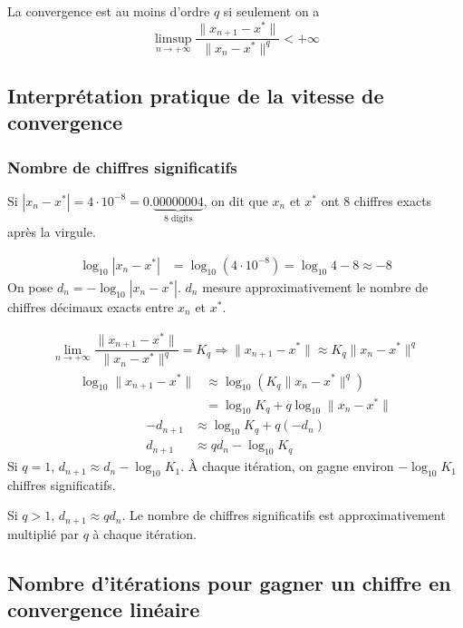 \documentclass[oneside]{book}
\begin{document}
\begin{remark}
La convergence est au moins d'ordre $q$ si seulement on a
$$ \limsup\limits_{n \to +\infty} \dfrac{\|x_{n+1}-x^*\|}{\|x_n-x^*\|^q} < +\infty $$
\end{remark}

\subsection{Interprétation pratique de la vitesse de convergence}

\subsubsection{Nombre de chiffres significatifs}
\begin{remark}
Si $|x_n - x^*| = 4 \cdot 10^{-8} = 0.\underbrace{00000004}_{\text{8 digits}}$,
on dit que $x_n$ et $x^*$ ont 8 chiffres exacts après la virgule.
\end{remark}

\begin{align*}
\log_{10} |x_n - x^*| &= \log_{10} (4 \cdot 10^{-8}) = \log_{10} 4 - 8 \approx -8
\end{align*}
On pose $d_n = -\log_{10} |x_n - x^*|$. $d_n$ mesure approximativement le nombre de chiffres décimaux exacts entre $x_n$ et $x^*$.

\begin{align*}
\lim\limits_{n \to +\infty} \dfrac{\|x_{n+1}-x^*\|}{\|x_n-x^*\|^q} = K_q \Rightarrow \|x_{n+1}-x^*\| \approx K_q \|x_n-x^*\|^q
\end{align*}
\begin{align*}
\log_{10} \|x_{n+1}-x^*\| &\approx \log_{10} (K_q \|x_n-x^*\|^q) \\
&= \log_{10} K_q + q \log_{10} \|x_n-x^*\|
\end{align*}
\begin{align*}
-d_{n+1} &\approx \log_{10} K_q + q (-d_n) \\
d_{n+1} &\approx q d_n - \log_{10} K_q
\end{align*}
Si $q=1$, $d_{n+1} \approx d_n - \log_{10} K_1$. À chaque itération, on gagne environ $-\log_{10} K_1$ chiffres significatifs.

Si $q > 1$, $d_{n+1} \approx q d_n$. Le nombre de chiffres significatifs est approximativement multiplié par $q$ à chaque itération.

\subsection{Nombre d'itérations pour gagner un chiffre en convergence linéaire}
\end{document}

